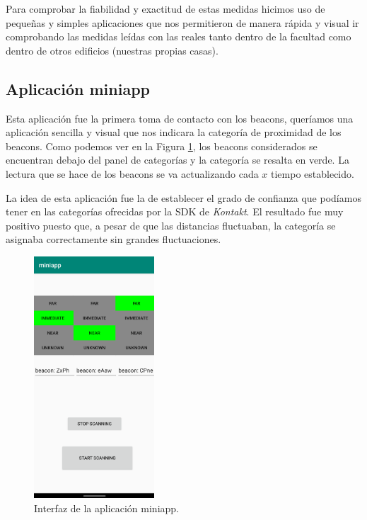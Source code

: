 Para comprobar la fiabilidad y exactitud de estas medidas hicimos uso de pequeñas y simples aplicaciones que nos permitieron de manera rápida y visual ir comprobando las medidas leídas con las reales tanto dentro de la facultad como dentro de otros edificios (nuestras propias casas).

\subsection{Aplicación miniapp}
Esta aplicación fue la primera toma de contacto con los beacons, queríamos una aplicación sencilla y visual que nos indicara la categoría de proximidad de los beacons. Como podemos ver en la Figura \ref{fig:miniapp}, los beacons considerados se encuentran debajo del panel de categorías y la categoría se resalta en verde. La lectura que se hace de los beacons se va actualizando cada $x$ tiempo establecido. 

La idea de esta aplicación fue la de establecer el grado de confianza que podíamos tener en las categorías ofrecidas por la SDK de \textit{Kontakt}. El resultado fue muy positivo puesto que, a pesar de que las distancias fluctuaban, la categoría se asignaba correctamente sin grandes fluctuaciones. 

\begin{figure}[t]
	\centering
	\includegraphics[width=0.4\textwidth]{Imagenes/Descripciondeltrabajo/miniapp}
	\caption{Interfaz de la aplicación miniapp. }
	\label{fig:miniapp}
\end{figure}

